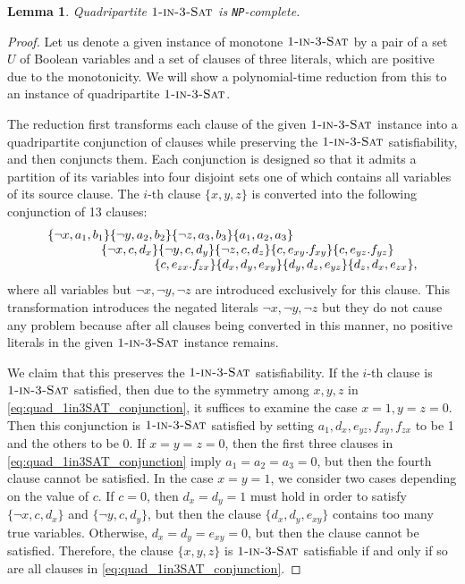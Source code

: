 \documentclass{article}
\newtheorem{lemma}[theorem]{Lemma}
\theoremstyle{remark}
\theoremstyle{definition}
\newcommand{\SAT}{\ensuremath{\mbox{\sc Sat}}}
\newcommand{\oneinthree}{\ensuremath{\mbox{\sc 1-in-3-\SAT}}}
\newcommand{\NP}{{\tt NP}}
\begin{document}
\begin{lemma}\label{lem:quad_1in3SAT}
	Quadripartite $\oneinthree$ is \NP-complete.
\end{lemma}
\begin{proof}
	Let us denote a given instance of monotone $\oneinthree$ by a pair of a set $U$ of Boolean variables and a set of clauses of three literals, which are positive due to the monotonicity. 
	We will show a polynomial-time reduction from this to an instance of quadripartite $\oneinthree$. 

	The reduction first transforms each clause of the given $\oneinthree$ instance into a quadripartite conjunction of clauses while preserving the $\oneinthree$ satisfiability, and then conjuncts them. 
	Each conjunction is designed so that it admits a partition of its variables into four disjoint sets one of which contains all variables of its source clause. 
	The $i$-th clause $\{x, y, z\}$ is converted into the following conjunction of 13 clauses: 
	\begin{equation}\label{eq:quad_1in3SAT_conjunction}
	\begin{array}{l}
		\{\neg x, a_1, b_1\} \{\neg y, a_2, b_2\} \{\neg z, a_3, b_3\} \{a_1, a_2, a_3\} \\ 
		\hspace*{15mm} \{\neg x, c, d_x\} \{\neg y, c, d_y\} \{\neg z, c, d_z\} \{c, e_{xy}. f_{xy}\} \{c, e_{yz}. f_{yz}\} \\ 
		\hspace*{30mm} \{c, e_{zx}. f_{zx}\} \{d_x, d_y, e_{xy}\} \{d_y, d_z, e_{yz}\} \{d_z, d_x, e_{zx}\}, 
	\end{array}
	\end{equation}
	where all variables but $\neg x, \neg y, \neg z$ are introduced exclusively for this clause. 
	This transformation introduces the negated literals $\neg x, \neg y, \neg z$ but they do not cause any problem because after all clauses being converted in this manner, no positive literals in the given $\oneinthree$ instance remains. 

	We claim that this preserves the $\oneinthree$ satisfiability. 
	If the $i$-th clause is $\oneinthree$ satisfied, then due to the symmetry among $x, y, z$ in \eqref{eq:quad_1in3SAT_conjunction}, it suffices to examine the case $x = 1, y = z = 0$. 
	Then this conjunction is $\oneinthree$ satisfied by setting $a_1, d_x, e_{yz}, f_{xy}, f_{zx}$ to be 1 and the others to be 0. 
	If $x = y = z = 0$, then the first three clauses in \eqref{eq:quad_1in3SAT_conjunction} imply $a_1 = a_2 = a_3 = 0$, but then the fourth clause cannot be satisfied. 
	In the case $x = y = 1$, we consider two cases depending on the value of $c$. 
	If $c = 0$, then $d_x = d_y = 1$ must hold in order to satisfy $\{\neg x, c, d_x\}$ and $\{\neg y, c, d_y\}$, but then the clause $\{d_x, d_y, e_{xy}\}$ contains too many true variables. 
	Otherwise, $d_x = d_y = e_{xy} = 0$, but then the clause cannot be satisfied. 
	Therefore, the clause $\{x, y, z\}$ is $\oneinthree$ satisfiable if and only if so are all clauses in \eqref{eq:quad_1in3SAT_conjunction}. 


\end{proof}
\end{document}
